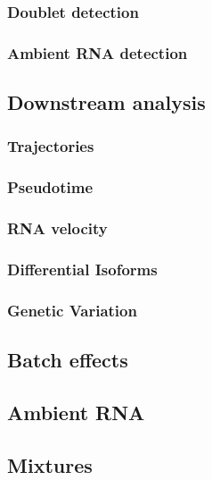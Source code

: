 \subsubsection{Doublet detection}
\subsubsection{Ambient RNA detection}
\subsection{Downstream analysis}
\subsubsection{Trajectories}
\subsubsection{Pseudotime}
\subsubsection{RNA velocity}
\subsubsection{Differential Isoforms}
\subsubsection{Genetic Variation}




\subsection{Batch effects}
\subsection{Ambient RNA}

\subsection{Mixtures}
